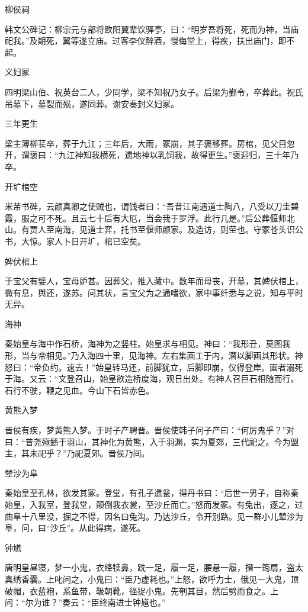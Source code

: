 \documentclass[a4paper,12pt,UTF8,twoside]{ctexbook}
\begin{document}
    柳侯祠
    
    韩文公碑记：柳宗元与部将欧阳翼辈饮驿亭，曰：“明岁吾将死，死而为神，当庙祀我。”及期死，翼等遂立庙。过客李仪醉酒，慢侮堂上，得疾，扶出庙门，即不起。
    
    义妇冢
    
    四明梁山伯、祝英台二人，少同学，梁不知祝乃女子。后梁为鄞令，卒葬此。祝氏吊墓下，墓裂而殒，遂同葬。谢安奏封义妇冢。
    
    三年更生
    
    梁主簿柳苌卒，葬于九江；三年后，大雨，冢崩，其子褒移葬。房棺，见父目忽开，谓褒曰：“九江神知我横死，遗地神以乳饲我，故得更生。”褒迎归，三十年乃卒。
    
    开圹棺空
    
    米芾书碑，云颜真卿之使贼也，谓饯者曰：“吾昔江南遇道士陶八，八受以刀圭碧霞，服之可不死。且云七十后有大厄，当会我于罗浮。此行几是。”后公葬偃师北山。有贾人至南海，见道士弈，托书至偃师颜家。及造访，则茔也。守冢苍头识公书，大惊。家人卜日开圹，棺已空矣。
    
    婢伏棺上
    
    于宝父有嬖人，宝母妒甚。因葬父，推入藏中。数年而母丧，开墓，其婢伏棺上，微有息，舆还，遂苏。问其状，言宝父为之通嗜欲，家中事纤悉与之说，知与平时无异。
    
    海神
    
    秦始皇与海中作石桥，海神为之竖柱。始皇求与相见。神曰：“我形丑，莫图我形，当与帝相见。”乃入海四十里，见海神。左右集画工于内，潜以脚画其形状。神怒曰：“帝负约。速去！”始皇转马还，前脚犹立，后脚即崩，仅得登岸。画者溺死于海。又云：“文登召山，始皇欲造桥度海，观日出处。有神人召巨石相随而行。石行不驶，鞭之见血。今山下石皆赤色。
    
    黄熊入梦
    
    晋侯有疾，梦黄熊入梦。于时子产聘晋。晋侯使韩子问子产曰：“何厉鬼乎？”对曰：“昔尧殛鲧于羽山，其神化为黄熊，入于羽渊，实为夏郊，三代祀之。今为盟主，其未祀乎？”乃祀夏郊。晋侯乃间。
    
    辇沙为阜
    
    秦始皇至孔林，欲发其冢。登堂，有孔子遗瓮，得丹书曰：“后世一男子，自称秦始皇，入我室，登我堂，颠倒我衣裳，至沙丘而亡。”怒而发冢。有兔出，逐之，过曲阜十八里没，掘之不得，因名曰兔沟。乃达沙丘，令开别路。见一群小儿辇沙为阜，问，曰“沙丘”。从此得病，遂死。
    
    钟馗
    
    唐明皇昼寝，梦一小鬼，衣绛犊鼻，跣一足，履一足，腰悬一履，搢一筠扇，盗太真绣香囊。上叱问之，小鬼曰：“臣乃虚耗也。”上怒，欲呼力士，俄见一大鬼，顶破帽，衣蓝袍，系鱼带，靸朝靴，径捉小鬼。先刳其目，然后劈而食之。上问：“尔为谁？”奏云：“臣终南进士钟馗也。”
    
\end{document}

